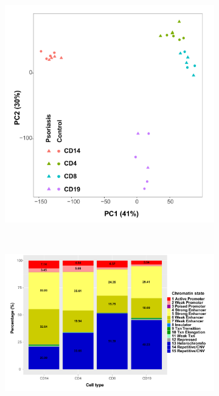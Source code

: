 \bigskip
\begin{figure}[H]
\centering
\begin{subfigure}[b]{0.6\textwidth}
\centering 
\includegraphics[width=\textwidth]{./Results2/pdfs/ChIPm_H3K27ac_all_cell_types_filtered_PCA}
\caption{}
\end{subfigure}
~
\begin{subfigure}[b]{0.8\textwidth} 
\centering
\includegraphics[width=\textwidth]{./Results2/pdfs/ChIPm_H3K27ac_cell_type_specific_master_list_chromatin_states_annotated_filtered}

\end{subfigure}
\end{figure}
